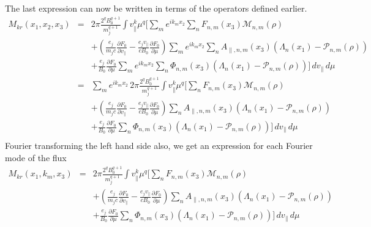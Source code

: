 The last expression can now be written in terms of the operators
defined earlier.
\begin{eqnarray*}
  M_{kr}(x_1,x_2,x_3) &=&2\pi\frac{2^qB_0^{q+1}}{m_j^{q+1}}
  \int v_\|^k \mu^q \Bigg[
    \sum_m e^{ik_mx_2}\sum_nF_{n,m}(x_3)\mathcal{M}_{n,m}(\rho)\\
    &&+\left(
      \frac{e_j}{m_jc}\frac{\partial F_0}{\partial v_\|}
      -\frac{e_jv_\|}{cB_0}\frac{\partial F_0}{\partial \mu}
    \right)
    \sum_m e^{ik_mx_2}\sum_n A_{\|,n,m}(x_3)\left(
      \Lambda_n(x_1)-\mathcal{P}_{n,m}(\rho)
    \right)\\
    &&+\frac{e_j}{B_0}\frac{\partial F_0}{\partial\mu}
    \sum_me^{ik_mx_2}\sum_n\Phi_{n,m}(x_3)\left(
      \Lambda_n(x_1)-\mathcal{P}_{n,m}(\rho)
    \right)
  \Bigg]\,dv_\|\,d\mu\\
  &=&\sum_m e^{ik_mx_2} \,2\pi\frac{2^qB_0^{q+1}}{m_j^{q+1}}
  \int v_\|^k \mu^q \Bigg[
    \sum_nF_{n,m}(x_3)\mathcal{M}_{n,m}(\rho)\\
    &&+\left(
      \frac{e_j}{m_jc}\frac{\partial F_0}{\partial v_\|}
      -\frac{e_jv_\|}{cB_0}\frac{\partial F_0}{\partial \mu}
    \right)
    \sum_n A_{\|,n,m}(x_3)\left(
      \Lambda_n(x_1)-\mathcal{P}_{n,m}(\rho)
    \right)\\
    &&+\frac{e_j}{B_0}\frac{\partial F_0}{\partial\mu}
    \sum_n\Phi_{n,m}(x_3)\left(
      \Lambda_n(x_1)-\mathcal{P}_{n,m}(\rho)
    \right)
  \Bigg]\,dv_\|\,d\mu\\
\end{eqnarray*}
Fourier transforming the left hand side also, we get an expression for
each Fourier mode of the flux
\begin{eqnarray*}
  M_{kr}(x_1,k_m,x_3) &=& 2\pi\frac{2^qB_0^{q+1}}{m_j^{q+1}}
  \int v_\|^k \mu^q \Bigg[
    \sum_nF_{n,m}(x_3)\mathcal{M}_{n,m}(\rho)\\
    &&+\left(
      \frac{e_j}{m_jc}\frac{\partial F_0}{\partial v_\|}
      -\frac{e_jv_\|}{cB_0}\frac{\partial F_0}{\partial \mu}
    \right)
    \sum_n A_{\|,n,m}(x_3)\left(
      \Lambda_n(x_1)-\mathcal{P}_{n,m}(\rho)
    \right)\\
    &&+\frac{e_j}{B_0}\frac{\partial F_0}{\partial\mu}
    \sum_n\Phi_{n,m}(x_3)\left(
      \Lambda_n(x_1)-\mathcal{P}_{n,m}(\rho)
    \right)
  \Bigg]\,dv_\|\,d\mu
\end{eqnarray*}

